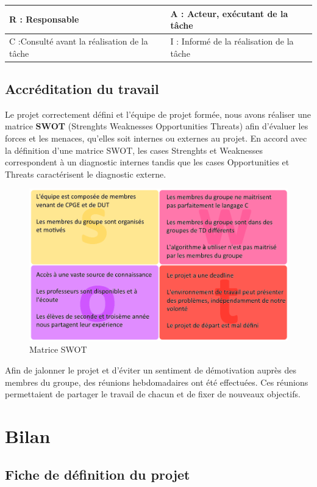 \documentclass{article}
\begin{document}
\begin{longtable}[c]{ll}
R : Responsable & A : Acteur, exécutant de la tâche \\
\endfirsthead
\endhead
C :Consulté avant la réalisation de la tâche & I : Informé de la réalisation de la tâche
\end{longtable}


\subsection{Accréditation du travail}

Le projet correctement défini et l'équipe de projet formée, nous avons réaliser une matrice \textbf{SWOT} (Strenghts Weaknesses Opportunities Threats) afin d'évaluer les forces et les menaces, qu'elles soit internes ou externes au projet. En accord avec la définition d'une matrice SWOT, les cases Strenghts et Weaknesses correspondent à un diagnostic internes tandis que les cases Opportunities et Threats caractérisent le diagnostic externe.

\begin{figure}[H]
    \centering
    \includegraphics[scale=0.5]{GDP/swot.png}
    \caption{\label{swot} Matrice SWOT}
\end{figure}

Afin de jalonner le projet et d'éviter un sentiment de démotivation auprès des membres du groupe, des réunions hebdomadaires ont été effectuées. Ces réunions permettaient de partager le travail de chacun et de fixer de nouveaux objectifs.


\section{Bilan}
\subsection{Fiche de définition du projet}
\end{document}
